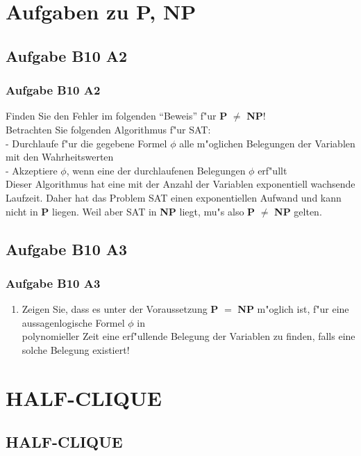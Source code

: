 \section{Aufgaben zu P, NP}
\subsection{Aufgabe B10 A2}
\begin{frame}
	\frametitle{Aufgabe B10 A2}
	Finden Sie den Fehler im folgenden ``Beweis'' f"ur \textbf{P} $\not=$ \textbf{NP}!\\
	Betrachten Sie folgenden Algorithmus f"ur SAT:\\[4pt]
	- Durchlaufe f"ur die gegebene Formel $\phi$ alle m"oglichen Belegungen der
	Variablen mit den Wahrheitswerten\\
	- Akzeptiere $\phi$, wenn eine der durchlaufenen Belegungen $\phi$ erf"ullt\\[4pt]
	Dieser Algorithmus hat eine mit der Anzahl der Variablen exponentiell wachsende
	Laufzeit. Daher hat das Problem SAT einen exponentiellen Aufwand und kann nicht in
	\textbf{P} liegen. Weil aber SAT in \textbf{NP} liegt, mu"s also \textbf{P} $\not=$
	\textbf{NP} gelten.
\end{frame}
\subsection{Aufgabe B10 A3}
\begin{frame}
	\frametitle{Aufgabe B10 A3}
	\begin{enumerate}
		\item Zeigen Sie, dass es unter der Voraussetzung \textbf{P} $=$ \textbf{NP} m"oglich
		ist, f"ur eine aussagenlogische Formel $\phi$ in\\
		polynomieller Zeit eine erf"ullende Belegung der Variablen zu finden, falls eine
		solche Belegung existiert!
	\end{enumerate}
\end{frame}

\section{HALF-CLIQUE}
\subsection{HALF-CLIQUE}
